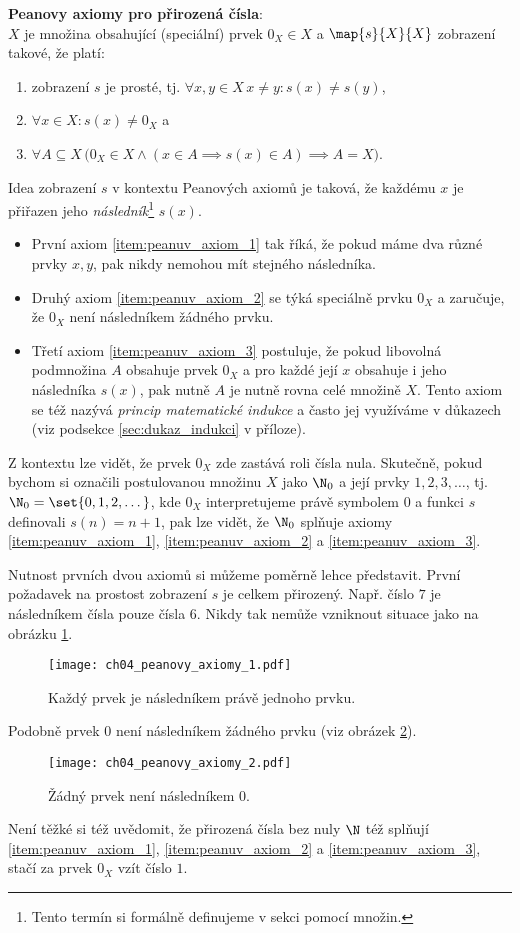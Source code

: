 \noindent\textbf{Peanovy axiomy pro přirozená čísla}:\\
$X$ je množina obsahující (speciální) prvek $0_X\in X$ a $\map{s}{X}{X}$ zobrazení takové, že platí:
\begin{enumerate}[label=({P}\arabic*)]
    \item\label{item:peanuv_axiom_1} zobrazení $s$ je prosté, tj. $\forall x,y\in X\,x\neq y: s(x)\neq s(y)$,
    \item\label{item:peanuv_axiom_2} $\forall x\in X: s(x)\neq 0_X$ a
    \item\label{item:peanuv_axiom_3} $\forall A\subseteq X\,\big(0_X\in X \land (x\in A\implies s(x)\in A)\implies A=X\big)$.
\end{enumerate}
Idea zobrazení $s$ v kontextu Peanových axiomů je taková, že každému $x$ je přiřazen jeho \emph{následník}\footnote{Tento termín si formálně definujeme v sekci  pomocí množin.} $s(x)$.
\begin{itemize}
    \item První axiom \ref{item:peanuv_axiom_1} tak říká, že pokud máme dva různé prvky $x,y$, pak nikdy nemohou mít stejného následníka.
    \item Druhý axiom \ref{item:peanuv_axiom_2} se týká speciálně prvku $0_X$ a zaručuje, že $0_X$ není následníkem žádného prvku.
    \item Třetí axiom \ref{item:peanuv_axiom_3} postuluje, že pokud libovolná podmnožina $A$ obsahuje prvek $0_X$ a pro každé její $x$ obsahuje i jeho následníka $s(x)$, pak nutně $A$ je nutně rovna celé množině $X$. Tento axiom se též nazývá \emph{princip matematické indukce} a často jej využíváme v důkazech (viz podsekce \ref{sec:dukaz_indukci} v příloze).
\end{itemize}
Z kontextu lze vidět, že prvek $0_X$ zde zastává roli čísla nula. Skutečně, pokud bychom si označili postulovanou množinu $X$ jako $\N_0$ a její prvky $1,2,3,\dots$, tj. $\N_0=\set{0,1,2,\dots}$, kde $0_X$ interpretujeme právě symbolem $0$ a funkci $s$ definovali $s(n)=n+1$, pak lze vidět, že $\N_0$ splňuje axiomy \ref{item:peanuv_axiom_1}, \ref{item:peanuv_axiom_2} a \ref{item:peanuv_axiom_3}.\par
Nutnost prvních dvou axiomů si můžeme poměrně lehce představit. První požadavek na prostost zobrazení $s$ je celkem přirozený. Např. číslo $7$ je následníkem čísla pouze čísla $6$. Nikdy tak nemůže vzniknout situace jako na obrázku \ref{fig:peanovy_axiomy_1}.
\begin{figure}[H]
	\centering
	\texttt{[image: ch04\_peanovy\_axiomy\_1.pdf]}
    \caption{Každý prvek je následníkem právě jednoho prvku.}
    \label{fig:peanovy_axiomy_1}
\end{figure}
Podobně prvek $0$ není následníkem žádného prvku (viz obrázek \ref{fig:peanovy_axiomy_2}).
\begin{figure}[H]
	\centering
	\texttt{[image: ch04\_peanovy\_axiomy\_2.pdf]}
    \caption{Žádný prvek není následníkem 0.}
    \label{fig:peanovy_axiomy_2}
\end{figure}
Není těžké si též uvědomit, že přirozená čísla bez nuly $\N$ též splňují \ref{item:peanuv_axiom_1}, \ref{item:peanuv_axiom_2} a \ref{item:peanuv_axiom_3}, stačí za prvek $0_X$ vzít číslo $1$.